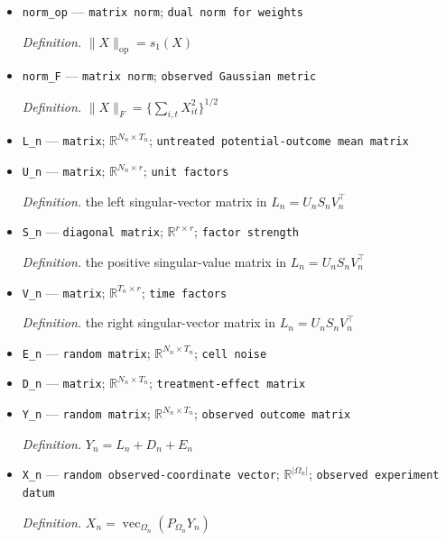 \documentclass{article}
\begin{document}
\begin{itemize}
  \par\smallskip\noindent\emph{Definition.} \(\lVert X\rVert_*=\sum_j s_j(X)\)
  \item \texttt{norm\_\allowbreak{}op} --- \texttt{matrix norm}; \texttt{dual norm for weights}
  \par\smallskip\noindent\emph{Definition.} \(\lVert X\rVert_{\mathrm{op}}=s_1(X)\)
  \item \texttt{norm\_\allowbreak{}F} --- \texttt{matrix norm}; \texttt{observed Gaussian metric}
  \par\smallskip\noindent\emph{Definition.} \(\lVert X\rVert_F=\{\sum_{i,t}X_{it}^2\}^{1/2}\)
  \item \texttt{L\_\allowbreak{}n} --- \texttt{matrix}; \(\mathbb R^{N_n\times T_n}\); \texttt{untreated potential-\allowbreak{}outcome mean matrix}
  \item \texttt{U\_\allowbreak{}n} --- \texttt{matrix}; \(\mathbb R^{N_n\times r}\); \texttt{unit factors}
  \par\smallskip\noindent\emph{Definition.} the left singular-vector matrix in \(L_n=U_nS_nV_n^{\top}\)
  \item \texttt{S\_\allowbreak{}n} --- \texttt{diagonal matrix}; \(\mathbb R^{r\times r}\); \texttt{factor strength}
  \par\smallskip\noindent\emph{Definition.} the positive singular-value matrix in \(L_n=U_nS_nV_n^{\top}\)
  \item \texttt{V\_\allowbreak{}n} --- \texttt{matrix}; \(\mathbb R^{T_n\times r}\); \texttt{time factors}
  \par\smallskip\noindent\emph{Definition.} the right singular-vector matrix in \(L_n=U_nS_nV_n^{\top}\)
  \item \texttt{E\_\allowbreak{}n} --- \texttt{random matrix}; \(\mathbb R^{N_n\times T_n}\); \texttt{cell noise}
  \item \texttt{D\_\allowbreak{}n} --- \texttt{matrix}; \(\mathbb R^{N_n\times T_n}\); \texttt{treatment-\allowbreak{}effect matrix}
  \item \texttt{Y\_\allowbreak{}n} --- \texttt{random matrix}; \(\mathbb R^{N_n\times T_n}\); \texttt{observed outcome matrix}
  \par\smallskip\noindent\emph{Definition.} \(Y_n=L_n+D_n+E_n\)
  \item \texttt{X\_\allowbreak{}n} --- \texttt{random observed-\allowbreak{}coordinate vector}; \(\mathbb R^{|\Omega_n|}\); \texttt{observed experiment datum}
  \par\smallskip\noindent\emph{Definition.} \(X_n=\operatorname{vec}_{\Omega_n}(P_{\Omega_n}Y_n)\)

\end{itemize}
\end{document}
